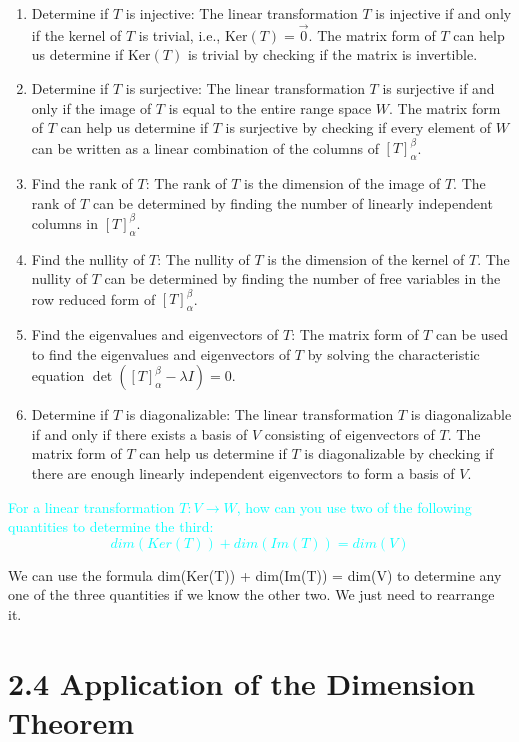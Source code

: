 \documentclass[fontsize=12pt]{scrartcl}
\begin{document}
\begin{enumerate}
	\item Determine if $T$ is injective: The linear transformation $T$ is injective if and only if the kernel of $T$ is trivial, i.e., $\text{Ker}(T) = {\vec{0}}$. The matrix form of $T$ can help us determine if $\text{Ker}(T)$ is trivial by checking if the matrix is invertible.
	\item Determine if $T$ is surjective: The linear transformation $T$ is surjective if and only if the image of $T$ is equal to the entire range space $W$. The matrix form of $T$ can help us determine if $T$ is surjective by checking if every element of $W$ can be written as a linear combination of the columns of $[T]_{\alpha}^{\beta}$.
	\item Find the rank of $T$: The rank of $T$ is the dimension of the image of $T$. The rank of $T$ can be determined by finding the number of linearly independent columns in $[T]_{\alpha}^{\beta}$.
	\item Find the nullity of $T$: The nullity of $T$ is the dimension of the kernel of $T$. The nullity of $T$ can be determined by finding the number of free variables in the row reduced form of $[T]_{\alpha}^{\beta}$.
	\item Find the eigenvalues and eigenvectors of $T$: The matrix form of $T$ can be used to find the eigenvalues and eigenvectors of $T$ by solving the characteristic equation $\det([T]_{\alpha}^{\beta} - \lambda I) = 0$.
	\item Determine if $T$ is diagonalizable: The linear transformation $T$ is diagonalizable if and only if there exists a basis of $V$ consisting of eigenvectors of $T$. The matrix form of $T$ can help us determine if $T$ is diagonalizable by checking if there are enough linearly independent eigenvectors to form a basis of $V$.
\end{enumerate}

\noindent
\textcolor{cyan}{For a linear transformation $T: V \to W$, how can you use two of the following quantities to determine the third: \[ dim(Ker(T)) + dim(Im(T)) = dim(V)\]}

We can use the formula dim(Ker(T)) + dim(Im(T)) = dim(V) to determine any one of the three quantities if we know the other two. We just need to rearrange it. 

\newpage

\section{2.4 Application of the Dimension Theorem}
\end{document}
